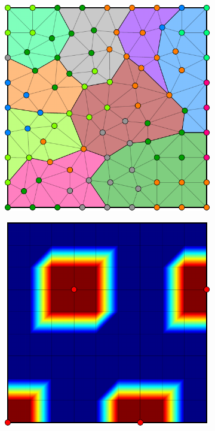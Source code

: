 \begin{figure}[htbp]
\begin{subfigure}[t]{0.3\textwidth}
  \end{subfigure}
  \hfill
  \begin{subfigure}[t]{0.3\textwidth}
    \centerline{\includegraphics[width=0.9\linewidth]{figs/square/square_tria_metis_node_part}}
  \end{subfigure}
  \par\bigskip
  \begin{subfigure}[t]{0.3\textwidth}
    \centerline{\includegraphics[width=0.9\linewidth]{figs/square/square_cart_struct_node_init}}

\end{subfigure}
\end{figure}
